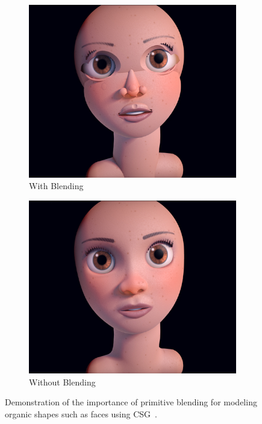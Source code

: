 \newpage


\begin{figure}
	\centering
	\begin{subfigure}[t]{0.45\textwidth}
		\centering
		\includegraphics[width=\textwidth]{Images/Face without blending}
		\caption{With Blending}
	\end{subfigure}
	\hfill
	\begin{subfigure}[t]{0.45\textwidth}
		\centering
		\includegraphics[width=\textwidth]{Images/Face with blending}
		\caption{Without Blending}
	\end{subfigure}
	\caption{Demonstration of the importance of primitive blending for modeling organic shapes such as faces using CSG~\cite{Quilez2013}.}
	\label{fig:primitive_blending}
\end{figure}

